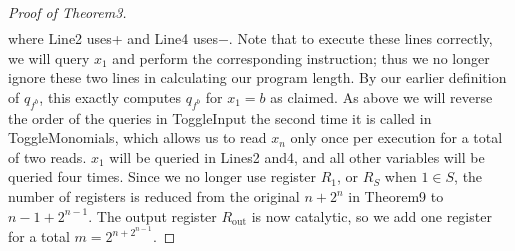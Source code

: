 \begin{proof}[Proof of Theorem3]
\begin{multline*}
\end{multline*}
where Line2 uses+ and Line4 uses−. Note that to execute these lines correctly, we will query $x_1$ and perform the corresponding instruction; thus we no longer ignore these two lines in calculating our program length.
By our earlier definition of $q_{f^b}$, this exactly computes $q_{f^b}$ for $x_1=b$ as claimed. As above we will reverse the order of the queries in ToggleInput the second time it is called in ToggleMonomials, which allows us to read $x_n$ only once per execution for a total of two reads. $x_1$ will be queried in Lines2 and4, and all other variables will be queried four times.
Since we no longer use register $R_1$, or $R_S$ when $1\in S$, the number of registers is reduced from the original $n+2^n$ in Theorem9 to $n-1+2^{n-1}$. The output register $R_{\mathrm{out}}$ is now catalytic, so we add one register for a total $m=2^{n+2^{n-1}}$.
\end{proof}
